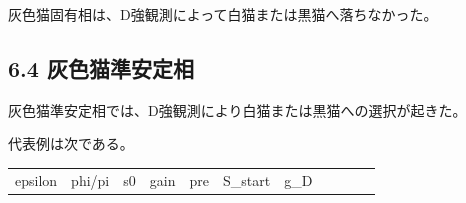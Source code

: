 \documentclass{article}
\newcounter{none}
\begin{document}
灰色猫固有相は、D強観測によって白猫または黒猫へ落ちなかった。

\subsection{6.4
灰色猫準安定相}\label{ux7070ux8272ux732bux6e96ux5b89ux5b9aux76f8}

灰色猫準安定相では、D強観測により白猫または黒猫への選択が起きた。

代表例は次である。

{\def\LTcaptype{none} %
\begin{longtable}[]{@{}
  >{\raggedleft\arraybackslash}p{}
  >{\raggedleft\arraybackslash}p{}
  >{\raggedleft\arraybackslash}p{}
  >{\raggedleft\arraybackslash}p{}
  >{\raggedleft\arraybackslash}p{}
  >{\raggedleft\arraybackslash}p{}
  >{\raggedleft\arraybackslash}p{}
  >{\raggedleft\arraybackslash}p{}
  >{\raggedright\arraybackslash}p{}
  >{\raggedright\arraybackslash}p{}
  >{\raggedleft\arraybackslash}p{}@{}}
\toprule\noalign{}
\begin{minipage}[b]{\linewidth}\raggedleft
epsilon
\end{minipage} & \begin{minipage}[b]{\linewidth}\raggedleft
phi/pi
\end{minipage} & \begin{minipage}[b]{\linewidth}\raggedleft
s0
\end{minipage} & \begin{minipage}[b]{\linewidth}\raggedleft
gain
\end{minipage} & \begin{minipage}[b]{\linewidth}\raggedleft
pre
\end{minipage} & \begin{minipage}[b]{\linewidth}\raggedleft
S\_start
\end{minipage} & \begin{minipage}[b]{\linewidth}\raggedleft
g\_D
\end{minipage} & \begin{minipage}[b]{\linewidth}\raggedleft

\end{minipage}
\end{longtable}}
\end{document}
